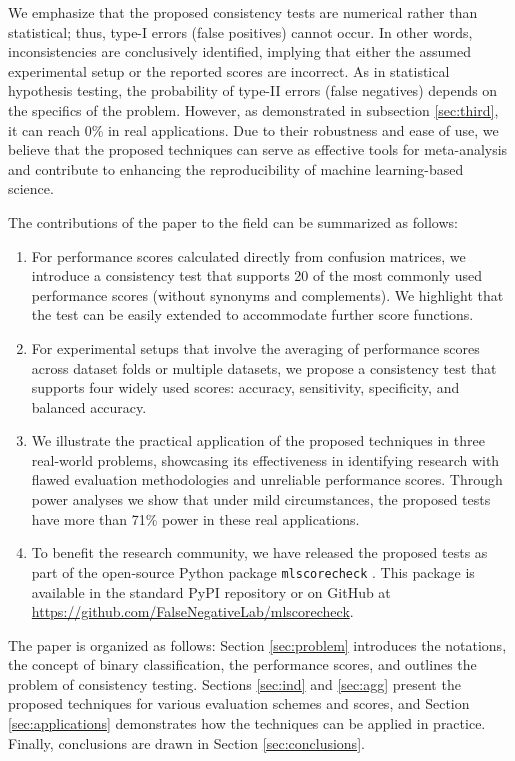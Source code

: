 \documentclass[3p, times]{elsarticle}
\begin{document}
We emphasize that the proposed consistency tests are numerical rather than statistical; thus, type-I errors (false positives) cannot occur. In other words, inconsistencies are conclusively identified, implying that either the assumed experimental setup or the reported scores are incorrect. 
As in statistical hypothesis testing, the probability of type-II errors (false negatives) depends on the specifics of the problem. However, as demonstrated in subsection \ref{sec:third}, it can reach 0\% in real applications.
Due to their robustness and ease of use, we believe that the proposed techniques can serve as effective tools for meta-analysis and contribute to enhancing the reproducibility of machine learning-based science.

The contributions of the paper to the field can be summarized as follows:
\begin{enumerate}
\item For performance scores calculated directly from confusion matrices, we introduce a consistency test that supports 20 of the most commonly used performance scores (without synonyms and complements). We highlight that the test can be easily extended to accommodate further score functions.
\item For experimental setups that involve the averaging of performance scores across dataset folds or multiple datasets, we propose a consistency test that supports four widely used scores: accuracy, sensitivity, specificity, and balanced accuracy.
\item We illustrate the practical application of the proposed techniques in three real-world problems, showcasing its effectiveness in identifying research with flawed evaluation methodologies and unreliable performance scores. {Through power analyses we show that under mild circumstances, the proposed tests have more than 71\% power in these real applications.}
\item To benefit the research community, we have released the proposed tests as part of the open-source Python package \verb|mlscorecheck| \cite{mlscorecheck}. This package is available in the standard PyPI repository or on GitHub at \url{https://github.com/FalseNegativeLab/mlscorecheck}.
\end{enumerate}

The paper is organized as follows: Section \ref{sec:problem} introduces the notations, the concept of binary classification, the performance scores, and outlines the problem of consistency testing. Sections \ref{sec:ind} and \ref{sec:agg} present the proposed techniques for various evaluation schemes and scores, and Section \ref{sec:applications} demonstrates how the techniques can be applied in practice. Finally, conclusions are drawn in Section \ref{sec:conclusions}.
\end{document}
